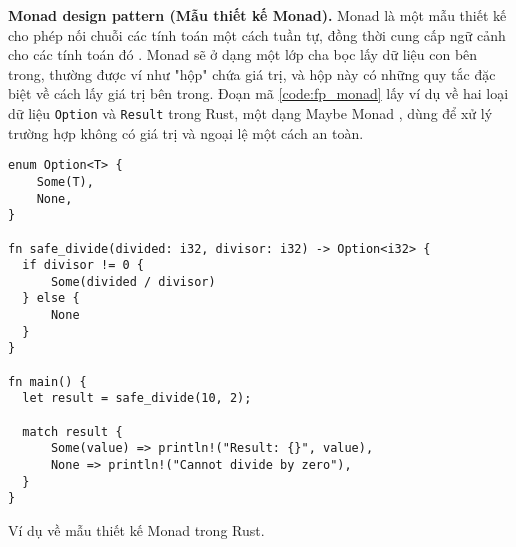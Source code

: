 
\textbf{Monad design pattern (Mẫu thiết kế Monad).} Monad là một mẫu thiết kế cho phép nối chuỗi các tính toán một cách tuần tự, đồng thời cung cấp ngữ cảnh cho các tính toán đó \cite{gill2015remote}.
Monad sẽ ở dạng một lớp cha bọc lấy dữ liệu con bên trong, thường được ví như "hộp" chứa giá trị, và hộp này có những quy tắc đặc biệt về cách lấy giá trị bên trong.
Đoạn mã \ref{code:fp_monad} lấy ví dụ về hai loại dữ liệu \texttt{Option} và \texttt{Result} trong Rust, một dạng Maybe Monad \cite{wikibooksHaskellUnderstandingMonadsMaybe}, dùng để xử lý trường hợp không có giá trị và ngoại lệ một cách an toàn.

\begin{listing}[H]
\begin{verbatim}
enum Option<T> {
    Some(T),
    None,
}

fn safe_divide(divided: i32, divisor: i32) -> Option<i32> {
  if divisor != 0 {
      Some(divided / divisor)
  } else {
      None
  }
}

fn main() {
  let result = safe_divide(10, 2);

  match result {
      Some(value) => println!("Result: {}", value),
      None => println!("Cannot divide by zero"),
  }
}
\end{verbatim}
\caption{Ví dụ về mẫu thiết kế Monad trong Rust.}
\label{code:fp_monad}
\end{listing}



